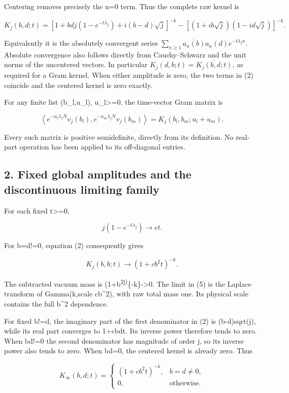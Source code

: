 \documentclass[
  11pt,
]{article}
\begin{document}
Centering removes precisely the n=0 term. Thus the complete raw kernel
is

\[
 \boxed{
 K_j(b,d;t)=
 \left[1+bdj(1-e^{-t\lambda_j})+i(b-d)\sqrt j\right]^{-k}
 -\left[(1+ib\sqrt j)(1-id\sqrt j)\right]^{-k}.
 }
 \tag{2}
\]

Equivalently it is the absolutely convergent series
\(\sum_{n\ge1}\overline{a_n(b)}a_n(d)e^{-t\lambda_jn}\). Absolute
convergence also follows directly from Cauchy--Schwarz and the unit
norms of the uncentered vectors. In particular
\(K_j(d,b;t)=\overline{K_j(b,d;t)}\), as required for a Gram kernel.
When either amplitude is zero, the two terms in (2) coincide and the
centered kernel is zero exactly.

For any finite list (b\_l,u\_l), u\_l\textgreater=0, the time-vector
Gram matrix is

\[
 \left\langle e^{-u_l\lambda_jN}v_j(b_l),
                e^{-u_m\lambda_jN}v_j(b_m)\right\rangle
 =K_j(b_l,b_m;u_l+u_m).
 \tag{3}
\]

Every such matrix is positive semidefinite, directly from its
definition. No real-part operation has been applied to its off-diagonal
entries.

\subsection{2. Fixed global amplitudes and the discontinuous limiting
family}\label{weak-coupling-part-5-fixed-global-amplitudes-and-the-discontinuous-limiting-family}

For each fixed t\textgreater=0,

\[
 j(1-e^{-t\lambda_j})\longrightarrow ct.
 \tag{4}
\]

For b=d!=0, equation (2) consequently gives

\[
 K_j(b,b;t)\longrightarrow(1+cb^2t)^{-k}.
 \tag{5}
\]

The subtracted vacuum mass is
(1+b\textsuperscript{2j)}\{-k\}-\textgreater0. The limit in (5) is the
Laplace transform of Gamma(k,scale cb\^{}2), with raw total mass one.
Its physical scale contains the full b\^{}2 dependence.

For fixed b!=d, the imaginary part of the first denominator in (2) is
(b-d)sqrt(j), while its real part converges to 1+cbdt. Its inverse power
therefore tends to zero. When bd!=0 the second denominator has magnitude
of order j, so its inverse power also tends to zero. When bd=0, the
centered kernel is already zero. Thus

\[
 K_\infty(b,d;t)=
 \begin{cases}
 (1+cb^2t)^{-k},&b=d\ne0,\\
 0,&\text{otherwise}.
 \end{cases}
 \tag{6}
\]
\end{document}
